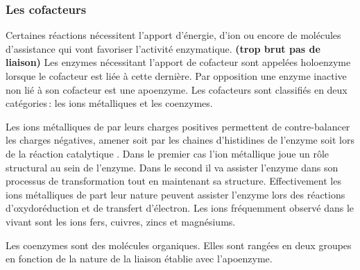 \begin{refsection}

    \subsubsection{Les cofacteurs}
    Certaines réactions nécessitent l’apport d'énergie, d’ion ou encore de molécules d'assistance qui vont favoriser l’activité enzymatique. \textbf{(trop brut pas de liaison)} Les enzymes nécessitant l'apport de cofacteur sont appelées holoenzyme lorsque le cofacteur est liée à cette dernière. Par opposition une enzyme inactive non lié à son cofacteur est une apoenzyme. Les cofacteurs sont classifiés en deux catégories : les ions métalliques et les coenzymes.
    
    Les ions métalliques de par leurs charges positives permettent de contre-balancer les charges négatives, amener soit par les chaines d'histidines de l'enzyme soit lors de la réaction catalytique \cite{christianson1991structural}. Dans le premier cas l'ion métallique joue un rôle structural au sein de l'enzyme. Dans le second il va assister l'enzyme dans son processus de transformation tout en maintenant sa structure. Effectivement les ions métalliques de part leur nature peuvent assister l'enzyme lors des réactions d'oxydoréduction et de transfert d'électron. Les ions fréquemment observé dans le vivant sont les ions fers, cuivres, zincs et magnésiums.
    
    Les coenzymes sont des molécules organiques. Elles sont rangées en deux groupes en fonction de la nature de la liaison établie avec l'apoenzyme.
    

\end{refsection}
